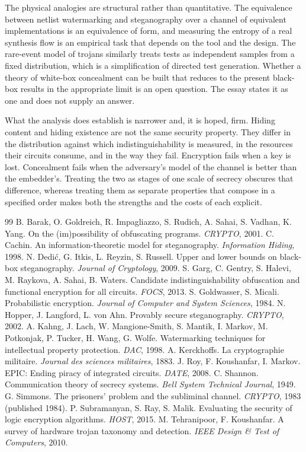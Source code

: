 \documentclass[11pt]{article}
\theoremstyle{definition}
\theoremstyle{remark}
\begin{document}
The physical analogies are structural rather than quantitative. The equivalence between netlist watermarking and steganography over a channel of equivalent implementations is an equivalence of form, and measuring the entropy of a real synthesis flow is an empirical task that depends on the tool and the design. The rare-event model of trojans similarly treats tests as independent samples from a fixed distribution, which is a simplification of directed test generation. Whether a theory of white-box concealment can be built that reduces to the present black-box results in the appropriate limit is an open question. The essay states it as one and does not supply an answer.

What the analysis does establish is narrower and, it is hoped, firm. Hiding content and hiding existence are not the same security property. They differ in the distribution against which indistinguishability is measured, in the resources their circuits consume, and in the way they fail. Encryption fails when a key is lost. Concealment fails when the adversary's model of the channel is better than the embedder's. Treating the two as stages of one scale of secrecy obscures that difference, whereas treating them as separate properties that compose in a specified order makes both the strengths and the costs of each explicit.

\begin{thebibliography}{99}
 B. Barak, O. Goldreich, R. Impagliazzo, S. Rudich, A. Sahai, S. Vadhan, K. Yang. On the (im)possibility of obfuscating programs. \emph{CRYPTO}, 2001.
 C. Cachin. An information-theoretic model for steganography. \emph{Information Hiding}, 1998.
 N. Dedi\'c, G. Itkis, L. Reyzin, S. Russell. Upper and lower bounds on black-box steganography. \emph{Journal of Cryptology}, 2009.
 S. Garg, C. Gentry, S. Halevi, M. Raykova, A. Sahai, B. Waters. Candidate indistinguishability obfuscation and functional encryption for all circuits. \emph{FOCS}, 2013.
 S. Goldwasser, S. Micali. Probabilistic encryption. \emph{Journal of Computer and System Sciences}, 1984.
 N. Hopper, J. Langford, L. von Ahn. Provably secure steganography. \emph{CRYPTO}, 2002.
 A. Kahng, J. Lach, W. Mangione-Smith, S. Mantik, I. Markov, M. Potkonjak, P. Tucker, H. Wang, G. Wolfe. Watermarking techniques for intellectual property protection. \emph{DAC}, 1998.
 A. Kerckhoffs. La cryptographie militaire. \emph{Journal des sciences militaires}, 1883.
 J. Roy, F. Koushanfar, I. Markov. EPIC: Ending piracy of integrated circuits. \emph{DATE}, 2008.
 C. Shannon. Communication theory of secrecy systems. \emph{Bell System Technical Journal}, 1949.
 G. Simmons. The prisoners' problem and the subliminal channel. \emph{CRYPTO}, 1983 (published 1984).
 P. Subramanyan, S. Ray, S. Malik. Evaluating the security of logic encryption algorithms. \emph{HOST}, 2015.
 M. Tehranipoor, F. Koushanfar. A survey of hardware trojan taxonomy and detection. \emph{IEEE Design \& Test of Computers}, 2010.
\end{thebibliography}
\end{document}
